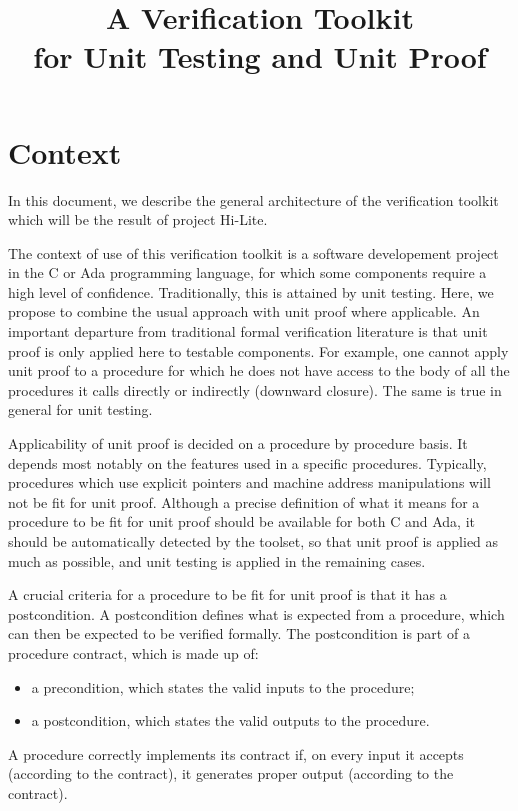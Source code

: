 \documentclass{article}
\title{A Verification Toolkit\\for Unit Testing and Unit Proof}
\begin{document}
\maketitle

\section{Context}

In this document, we describe the general architecture of the verification
toolkit which will be the result of project Hi-Lite.

The context of use of this verification toolkit is a software developement
project in the C or Ada programming language, for which some components require
a high level of confidence. Traditionally, this is attained by unit
testing. Here, we propose to combine the usual approach with unit proof where
applicable. An important departure from traditional formal verification
literature is that unit proof is only applied here to testable components. For
example, one cannot apply unit proof to a procedure for which he does not have
access to the body of all the procedures it calls directly or indirectly
(downward closure). The same is true in general for unit testing.

Applicability of unit proof is decided on a procedure by procedure basis. It
depends most notably on the features used in a specific procedures. Typically,
procedures which use explicit pointers and machine address manipulations will
not be fit for unit proof. Although a precise definition of what it means for a
procedure to be fit for unit proof should be available for both C and Ada, it
should be automatically detected by the toolset, so that unit proof is applied
as much as possible, and unit testing is applied in the remaining cases.

A crucial criteria for a procedure to be fit for unit proof is that it has a
postcondition. A postcondition defines what is expected from a procedure, which
can then be expected to be verified formally. The postcondition is part of a
procedure contract, which is made up of:
\begin{itemize}
\item a precondition, which states the valid inputs to the procedure;
\item a postcondition, which states the valid outputs to the procedure.
\end{itemize}

A procedure correctly implements its contract if, on every input it accepts
(according to the contract), it generates proper output (according to the
contract).
\end{document}
